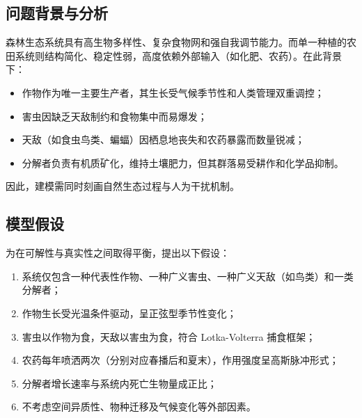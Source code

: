 \documentclass[12pt]{article}
\begin{document}
\subsection{问题背景与分析}
森林生态系统具有高生物多样性、复杂食物网和强自我调节能力。而单一种植的农田系统则结构简化、稳定性弱，高度依赖外部输入（如化肥、农药）。在此背景下：
\begin{itemize}
    \item 作物作为唯一主要生产者，其生长受气候季节性和人类管理双重调控；
    \item 害虫因缺乏天敌制约和食物集中而易爆发；
    \item 天敌（如食虫鸟类、蝙蝠）因栖息地丧失和农药暴露而数量锐减；
    \item 分解者负责有机质矿化，维持土壤肥力，但其群落易受耕作和化学品抑制。
\end{itemize}
因此，建模需同时刻画自然生态过程与人为干扰机制。

\subsection{模型假设}
为在可解性与真实性之间取得平衡，提出以下假设：
\begin{enumerate}
    \item 系统仅包含一种代表性作物、一种广义害虫、一种广义天敌（如鸟类）和一类分解者；
    \item 作物生长受光温条件驱动，呈正弦型季节性变化；
    \item 害虫以作物为食，天敌以害虫为食，符合 Lotka-Volterra 捕食框架；
    \item 农药每年喷洒两次（分别对应春播后和夏末），作用强度呈高斯脉冲形式；
    \item 分解者增长速率与系统内死亡生物量成正比；
    \item 不考虑空间异质性、物种迁移及气候变化等外部因素。
\end{enumerate}
\end{document}

